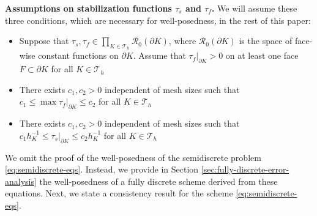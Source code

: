 \documentclass[10pt,letterpaper]{amsart}
\theoremstyle{plain} %
\theoremstyle{remark} %
\begin{document}
\vskip2mm
\noindent 
\textbf{Assumptions on stabilization functions $\tau_{s}$ and $\tau_{f}$.} We will assume these three conditions, which are necessary for well-posedness, in the rest of this paper: 
%
\begin{itemize}
	\item[(A1)] Suppose that $\tau_s, \tau_f \in \prod_{K \in \mathcal{T}_h} \mathcal{R}_0(\partial K)$, where $\mathcal{R}_0(\partial K)$ is the space of face-wise constant functions on $\partial K$. Assume that $\tau_f|_{\partial K} > 0$ on at least one face $F \subset \partial K$ for all $K \in \mathcal{T}_h$
	\item[(A2)] There exists $c_1, c_2 >0$ independent of mesh sizes such that $c_1 \le \max \tau_f|_{\partial K} \le c_2$ for all $K \in \mathcal{T}_h$
	\item[(A3)] There exists $c_1, c_2 >0$ independent of mesh sizes such that $c_1 h_K^{-1} \le \tau_s|_{\partial K} \le c_2 h_K^{-1}$ for all $K \in \mathcal{T}_h$
\end{itemize}
%

We omit the proof of the well-posedness of the semidiscrete problem \eqref{eq:semidiscrete-eqs}. Instead, we provide in Section \ref{sec:fully-discrete-error-analysis} the well-posedness of a fully discrete scheme derived from these equations. Next, we state a consistency result for the scheme \eqref{eq:semidiscrete-eqs}.
\end{document}
